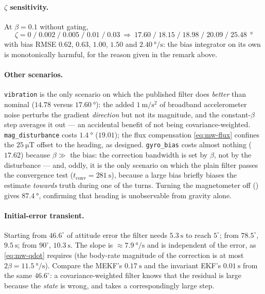 \paragraph{$\zeta$ sensitivity.} At $\beta=0.1$ without gating,
\[
\zeta = 0\;/\;0.002\;/\;0.005\;/\;0.01\;/\;0.03
\ \Longrightarrow\
17.60\;/\;18.15\;/\;18.98\;/\;20.09\;/\;25.48\ \SI{}{\degree}
\]
with bias RMSE $0.62$, $0.63$, $1.00$, $1.50$ and $\SI{2.40}{\degree\per\second}$: the bias
integrator on its own is monotonically harmful, for the reason given in the remark above.

\paragraph{Other scenarios.} \texttt{vibration} is the only scenario on which the published filter
does \emph{better} than nominal ($14.78$ versus $\SI{17.60}{\degree}$): the added
$\SI{1}{\metre\per\second\squared}$ of broadband accelerometer noise perturbs the gradient
\emph{direction} but not its magnitude, and the constant-$\beta$ step averages it out --- an
accidental benefit of not being covariance-weighted. \texttt{mag\_disturbance} costs
$\SI{1.4}{\degree}$ ($19.01$); the flux compensation \eqref{eq:mw-flux} confines the
$\SI{25}{\micro\tesla}$ offset to the heading, as designed. \texttt{gyro\_bias} costs almost nothing
($17.62$) because $\beta\gg$ the bias: the correction bandwidth is set by $\beta$, not by the
disturbance --- and, oddly, it is the only scenario on which the plain filter passes the convergence
test ($t_{\text{conv}}=\SI{281}{\second}$), because a large bias briefly biases the estimate
\emph{towards} truth during one of the turns. Turning the magnetometer off
(\code{use\_mag=false}) gives $\SI{87.4}{\degree}$, confirming that heading is unobservable from
gravity alone.

\paragraph{Initial-error transient.} Starting from $46.6^\circ$ of attitude error the filter needs
$\SI{5.3}{\second}$ to reach $5^\circ$; from $78.5^\circ$, $\SI{9.5}{\second}$; from $90^\circ$,
$\SI{10.3}{\second}$. The slope is $\approx\SI{7.9}{\degree\per\second}$ and is independent of the
error, as \eqref{eq:mw-qdot} requires (the body-rate magnitude of the correction is at most
$2\beta=\SI{11.5}{\degree\per\second}$). Compare the MEKF's $\SI{0.17}{\second}$ and the invariant
EKF's $\SI{0.01}{\second}$ from the same $46.6^\circ$: a covariance-weighted filter knows that the
residual is large because the \emph{state} is wrong, and takes a correspondingly large step.

